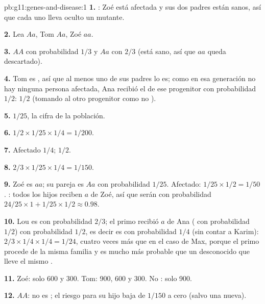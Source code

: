 \begin{solution}{pb:g11:genes-and-disease:1}
\textbf{1.} : Zoé está afectada y sus dos padres están sanos,
así que cada uno lleva oculto un  mutante.

\textbf{2.} Lea $Aa$, Tom $Aa$, Zoé $aa$.

\textbf{3.} $AA$ con probabilidad $1/3$ y $Aa$ con $2/3$ (está sano,
así que $aa$ queda descartado).

\textbf{4.} Tom es , así que al menos uno de sus padres lo es;
como en esa generación no hay ninguna persona afectada, Ana recibió el
 de ese progenitor con probabilidad $1/2$: $1/2$ (tomando al otro
progenitor como no ).

\textbf{5.} $1/25$, la cifra de la población.

\textbf{6.} $1/2 \times 1/25 \times 1/4 = 1/200$.

\textbf{7.} Afectado $1/4$;  $1/2$.

\textbf{8.} $2/3 \times 1/25 \times 1/4 = 1/150$.

\textbf{9.} Zoé es $aa$; su pareja es $Aa$ con probabilidad $1/25$.
Afectado: $1/25 \times 1/2 = 1/50$. : todos los hijos reciben
$a$ de Zoé, así que serán  con probabilidad $24/25 \times 1 + 1/25 \times
1/2 \approx 0.98$.

\textbf{10.} Lou es  con probabilidad $2/3$; el primo recibió
$a$ de Ana ( con probabilidad $1/2$) con probabilidad $1/2$,
es decir es  con probabilidad $1/4$ (sin contar a Karim):
$2/3 \times 1/4
\times 1/4 = 1/24$, cuatro veces más que en el caso de
Max, porque el primo procede de la misma familia y es mucho más
probable que un desconocido que lleve el mismo .

\textbf{11.} Zoé: solo 600 y 300. Tom: 900, 600 y 300. No :
solo 900.

\textbf{12.} $AA$: no es ; el riesgo para su hijo baja de
$1/150$ a cero (salvo una  nueva).


\end{solution}
